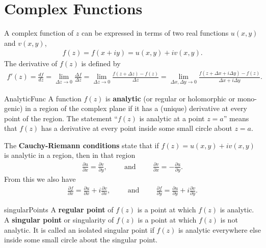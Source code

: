 \section{Complex Functions}
A complex function of $z$ can be expressed in terms of two real functions $u(x,y)$ and $v(x,y)$,
\begin{align}
	f(z) = f(x+iy) = u(x,y)+iv(x,y).
\end{align}
The derivative of $f(z)$ is defined by
\begin{align}
	f'(z) = \frac{df}{dz} = \lim\limits_{\Delta z \rightarrow 0}\frac{\Delta f}{\Delta z} =\lim\limits_{\Delta z \rightarrow 0} \frac{f(z+\Delta z)-f(z)}{\Delta z}=\lim\limits_{\Delta x, \Delta y \rightarrow 0} \frac{f(z+\Delta x+i\Delta y)-f(z)}{\Delta x+i\Delta y}.
\end{align}
\begin{defn}{AnalyticFunc}
A function $f(z)$ is \textbf{analytic} (or regular or holomorphic or mono-genic) in a region of the complex plane if it has a (unique) derivative at every point of the region. The statement “$f(z)$ is analytic at a point $z = a$” means that $f(z)$ has a derivative at every point inside some small circle about $z = a$.
\end{defn}
The \textbf{Cauchy-Riemann conditions} state that if $f(z) = u(x, y) + iv(x, y)$ is analytic in a region, then in that region
\begin{align}
	\frac{\partial u}{\partial x} = \frac{\partial v}{\partial y}, \hspace{1cm}\textrm{and}\hspace{1cm} \frac{\partial v}{\partial x} = - \frac{\partial u}{\partial y}.
\end{align}
From this we also have
\begin{align}
	\frac{\partial f}{\partial x} =\frac{\partial u}{\partial x} + i\frac{\partial v}{\partial x}, \hspace{1cm}\textrm{and}\hspace{1cm} \frac{\partial f}{\partial y} =\frac{\partial u}{\partial y} + i\frac{\partial v}{\partial y}.
\end{align}
\begin{defn}{singularPoints}
	A \textbf{regular point} of $f(z)$ is a point at which $f (z)$ is analytic.
	A \textbf{singular point} or singularity of $f (z)$ is a point at which $f (z)$ is not analytic.
	It is called an isolated singular point if $f (z)$ is analytic everywhere else inside
	some small circle about the singular point.
\end{defn}

